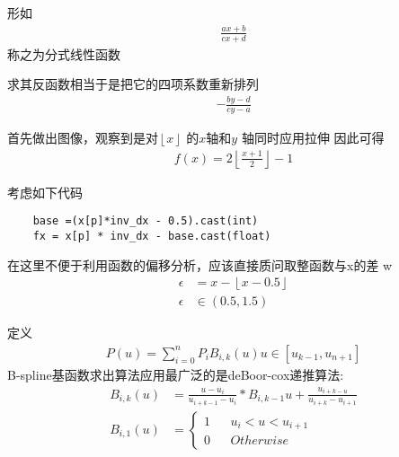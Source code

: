 \begin{thm}[分式线性函数]
形如
\begin{align}
		\frac{ax+b}{cx+d} 
\end{align}
称之为分式线性函数
\par 求其反函数相当于是把它的四项系数重新排列
\begin{align}
	-	\frac{by-d}{cy-a} 
\end{align}
\end{thm}
\begin{thm}
\end{thm}
\begin{thm}[求$x$左边最近的奇数]
首先做出图像，观察到是对$ \left\lfloor x \right\rfloor $ 的$x$轴和$ y $ 轴同时应用拉伸
因此可得
\begin{align*}
		f(x) = 2\left\lfloor \frac{x+1}{2}  \right\rfloor -1
\end{align*}
\end{thm}
\begin{thm}[取整函数分析]
	考虑如下代码	
	\begin{lstlisting}
	base =(x[p]*inv_dx - 0.5).cast(int)
	fx = x[p] * inv_dx - base.cast(float)
	\end{lstlisting}
	在这里不便于利用函数的偏移分析，应该直接质问取整函数与x的差 
	w\begin{align*}
			\epsilon  &= x- \left\lfloor x-0.5\right\rfloor \\
			\epsilon &\in \left( 0.5,1.5 \right) 
	\end{align*}	
\end{thm}
\begin{thm}
		定义
		\begin{align*}
				P\left( u \right) =\sum_{i=0}^{n} P_iB_{i,k}(u) 
				u \in \left[ u_{k-1},u_{n+1} \right] 
		\end{align*}
		B-spline基函数求出算法应用最广泛的是deBoor-cox递推算法:
		\begin{align*}
				B_{i,k}\left( u \right) &=\frac{u-u_i}{u_{i+k-1}-u_i} *B_{i,k-1}u+\frac{u_{i+k-u}}{u_{i+k}-u_{i+1}} \\
				B_{i,1}\left( u \right) &=\left\{\begin{aligned}
								1  && u_i<u<u_{i+1}\\
	0 && Otherwise
				\end{aligned}\right.
		\end{align*}
    
\end{thm}
\begin{thm}

\end{thm}
